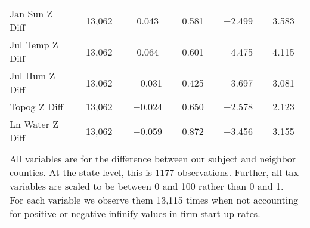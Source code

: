 \begin{table}[!htbp]
\begin{tabular}{@{\extracolsep{5pt}}lccccc}
Jan Sun Z Diff & 13,062 & 0.043 & 0.581 & $-$2.499 & 3.583 \\ 
Jul Temp Z Diff & 13,062 & 0.064 & 0.601 & $-$4.475 & 4.115 \\ 
Jul Hum Z Diff & 13,062 & $-$0.031 & 0.425 & $-$3.697 & 3.081 \\ 
Topog Z Diff & 13,062 & $-$0.024 & 0.650 & $-$2.578 & 2.123 \\ 
Ln Water Z Diff & 13,062 & $-$0.059 & 0.872 & $-$3.456 & 3.155 \\ 
\hline \\[-1.8ex] 
\multicolumn{6}{l}{All variables are for the difference between our subject and neighbor counties. At the state level, this is 1177 observations. Further, all tax variables are scaled to be between 0 and 100 rather than 0 and 1. For each variable we observe them 13,115 times when not accounting for positive or negative infinify values in firm start up rates.} \\ 
\end{tabular} 
\end{table} 
